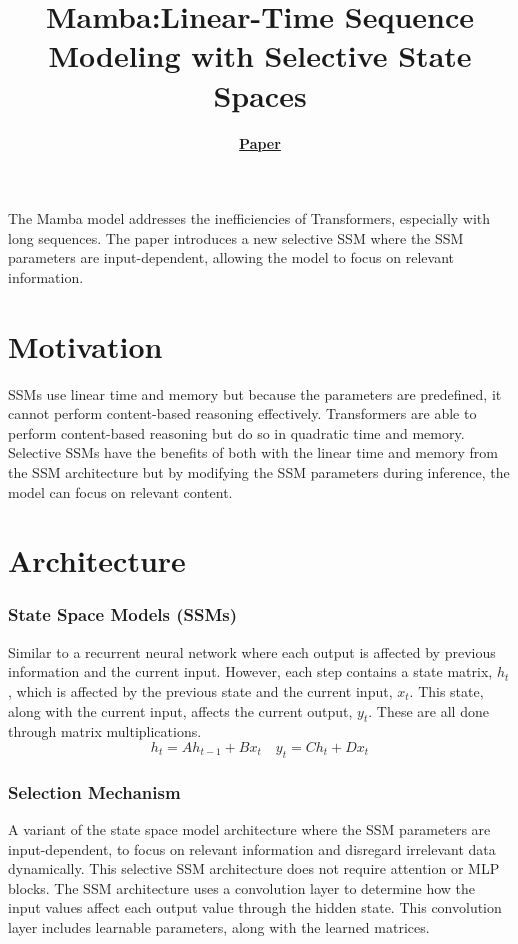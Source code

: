 \documentclass{article}
\title{Mamba:\@ Linear-Time Sequence Modeling with Selective State Spaces}
\author{\textbf{\href{https://arxiv.org/pdf/2312.00752}{Paper}}}
\date{}
\begin{document}
\maketitle

The Mamba model addresses the inefficiencies of Transformers, especially with long sequences. The paper introduces a new selective SSM where the SSM parameters are input-dependent, allowing the model to focus on relevant information.

\section*{Motivation}

SSMs use linear time and memory but because the parameters are predefined, it cannot perform content-based reasoning effectively. Transformers are able to perform content-based reasoning but do so in quadratic time and memory. Selective SSMs have the benefits of both with the linear time and memory from the SSM architecture but by modifying the SSM parameters during inference, the model can focus on relevant content.

\section*{Architecture}

\subsubsection*{State Space Models (SSMs)}

Similar to a recurrent neural network where each output is affected by previous information and the current input. However, each step contains a state matrix, $h_t$, which is affected by the previous state and the current input, $x_t$. This state, along with the current input, affects the current output, $y_t$. These are all done through matrix multiplications.
\[h_t = Ah_{t-1}+Bx_t\quad y_t = Ch_t + Dx_t\]

\subsubsection*{Selection Mechanism}

A variant of the state space model architecture where the SSM parameters are input-dependent, to focus on relevant information and disregard irrelevant data dynamically. This selective SSM architecture does not require attention or MLP blocks. The SSM architecture uses a convolution layer to determine how the input values affect each output value through the hidden state. This convolution layer includes learnable parameters, along with the learned matrices.
\end{document}
